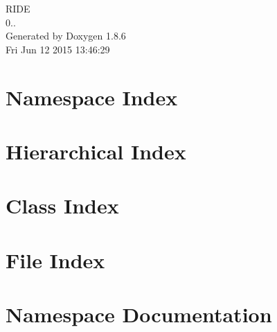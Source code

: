 \documentclass[twoside]{book}
\newcommand{\clearemptydoublepage}{%
  \newpage{\pagestyle{empty}\cleardoublepage}%
}
\begin{document}
\hypersetup{pageanchor=false}
\begin{titlepage}
\vspace*{7cm}
\begin{center}%
{\Large R\-I\-D\-E \\[1ex]\large 0.. }\\
\vspace*{1cm}
{\large Generated by Doxygen 1.8.6}\\
\vspace*{0.5cm}
{\small Fri Jun 12 2015 13:46:29}\\
\end{center}
\end{titlepage}
\clearemptydoublepage
\tableofcontents
\clearemptydoublepage
{}
\hypersetup{pageanchor=true}

\chapter{Namespace Index}

\chapter{Hierarchical Index}

\chapter{Class Index}

\chapter{File Index}

\chapter{Namespace Documentation}






\end{document}
